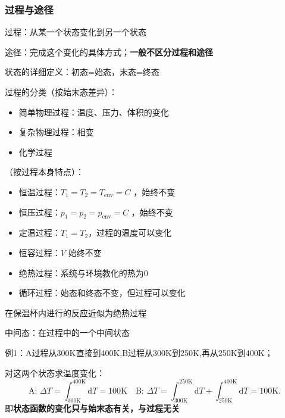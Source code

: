 \subsubsection*{过程与途径}%
\label{subsub*:过程与途径}
\begin{defi}
    过程：从某一个状态变化到另一个状态

    途径：完成这个变化的具体方式；\textbf{一般不区分过程和途径}
\end{defi}
\begin{defi}
    状态的详细定义：初态=始态，末态=终态
\end{defi}
过程的分类（按始末态差异）：
\begin{itemize}
    \item 简单物理过程：温度、压力、体积的变化
    \item 复杂物理过程：相变
    \item 化学过程
\end{itemize}
（按过程本身特点）：
\begin{itemize}
    \item 恒温过程：$T_1=T_2=T_\text{env}=C$ ，始终不变
    \item 恒压过程：$p_1=p_2=p_\text{env}=C$ ，始终不变
    \item 定温过程：$T_1=T_2$，过程的温度可以变化
    \item 恒容过程：$V$ 始终不变
    \item 绝热过程：系统与环境教化的热为0
    \item 循环过程：始态和终态不变，但过程可以变化
\end{itemize}
\begin{eg}
在保温杯内进行的反应近似为绝热过程
\end{eg}
\begin{defi}
    中间态：在过程中的一个中间状态
\end{defi}
\begin{eg}
    例1：A过程从300K直接到400K,B过程从300K到250K,再从250K到400K；

    对这两个状态求温度变化：
    \[
        \text{A: }\Delta T = \int_{300\text{K}}^{400\text{K}} \mathrm{d}T = 100\text{K} \quad \text{B: }\Delta T = \int_{300\text{K}}^{250\text{K}}  \mathrm{d}T + \int_{250\text{K}}^{400\text{K}}  \mathrm{d}T = 100\text{K}
    .\]
    即\textbf{状态函数的变化只与始末态有关，与过程无关}
\end{eg}
